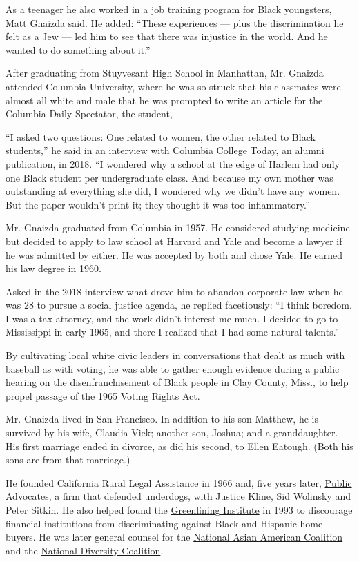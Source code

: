 As a teenager he also worked in a job training program for Black
youngsters, Matt Gnaizda said. He added: ``These experiences --- plus
the discrimination he felt as a Jew --- led him to see that there was
injustice in the world. And he wanted to do something about it.''

After graduating from Stuyvesant High School in Manhattan, Mr. Gnaizda
attended Columbia University, where he was so struck that his classmates
were almost all white and male that he was prompted to write an article
for the Columbia Daily Spectator, the student,

``I asked two questions: One related to women, the other related to
Black students,'' he said in an interview with
\href{https://www.college.columbia.edu/cct/latest/minds/talking-social-advocacy-robert-gnaizda-57-and-rebecca-kee-05}{Columbia
College Today}, an alumni publication, in 2018. ``I wondered why a
school at the edge of Harlem had only one Black student per
undergraduate class. And because my own mother was outstanding at
everything she did, I wondered why we didn't have any women. But the
paper wouldn't print it; they thought it was too inflammatory.''

Mr. Gnaizda graduated from Columbia in 1957. He considered studying
medicine but decided to apply to law school at Harvard and Yale and
become a lawyer if he was admitted by either. He was accepted by both
and chose Yale. He earned his law degree in 1960.

Asked in the 2018 interview what drove him to abandon corporate law when
he was 28 to pursue a social justice agenda, he replied facetiously: ``I
think boredom. I was a tax attorney, and the work didn't interest me
much. I decided to go to Mississippi in early 1965, and there I realized
that I had some natural talents.''

By cultivating local white civic leaders in conversations that dealt as
much with baseball as with voting, he was able to gather enough evidence
during a public hearing on the disenfranchisement of Black people in
Clay County, Miss., to help propel passage of the 1965 Voting Rights
Act.

Mr. Gnaizda lived in San Francisco. In addition to his son Matthew, he
is survived by his wife, Claudia Viek; another son, Joshua; and a
granddaughter. His first marriage ended in divorce, as did his second,
to Ellen Eatough. (Both his sons are from that marriage.)

He founded California Rural Legal Assistance in 1966 and, five years
later, \href{https://www.publicadvocates.org/}{Public Advocates}, a firm
that defended underdogs, with Justice Kline, Sid Wolinsky and Peter
Sitkin. He also helped found the
\href{https://greenlining.org/}{Greenlining Institute} in 1993 to
discourage financial institutions from discriminating against Black and
Hispanic home buyers. He was later general counsel for the
\href{https://www.naac.org/}{National Asian American Coalition} and the
\href{https://www.nationaldiversitycoalition.org/}{National Diversity
Coalition}.

